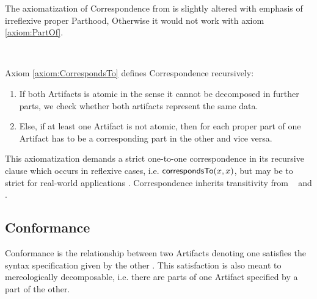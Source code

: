 The axiomatization of \gls{Correspondence} from \cite{HeinzLV17} is slightly altered with emphasis of irreflexive proper \gls{Parthood}, Otherwise it would not work with axiom \ref{axiom:PartOf}.
\begin{axiom}[\correspondsTo]
\label{axiom:CorrespondsTo}
~\newline
{}
\end{axiom}
Axiom \ref{axiom:CorrespondsTo} defines \gls{Correspondence} recursively:
\begin{enumerate}[align=left,label=\textbf{Case \Roman*},ref={\Roman*}]
\item
If both \glspl{Artifact} is atomic in the sense it cannot be decomposed in further parts, we check whether both artifacts represent the same data.

\item
Else, if at least one \gls{Artifact} is not atomic, then for each proper part of one \gls{Artifact} has to be a corresponding part in the other and vice versa.
\end{enumerate}
This axiomatization demands a strict one-to-one correspondence in its recursive clause which occurs in reflexive cases, i.e. $\textsf{correspondsTo}(x,x)$, but may be to strict for real-world applications \cite{DBLP:conf/sle/Lammel16}.
\Gls{Correspondence} inherits transitivity from \represents~ and \properPartOf.

\subsection{Conformance}
\label{subsection:Conformance}
\Gls{Conformance} is the relationship between two \glspl{Artifact} denoting one satisfies the syntax specification given by the other \cite{HeinzLV17}.
This satisfaction is also meant to mereologically decomposable, i.e. there are parts of one \gls{Artifact} specified by a part of the other.


